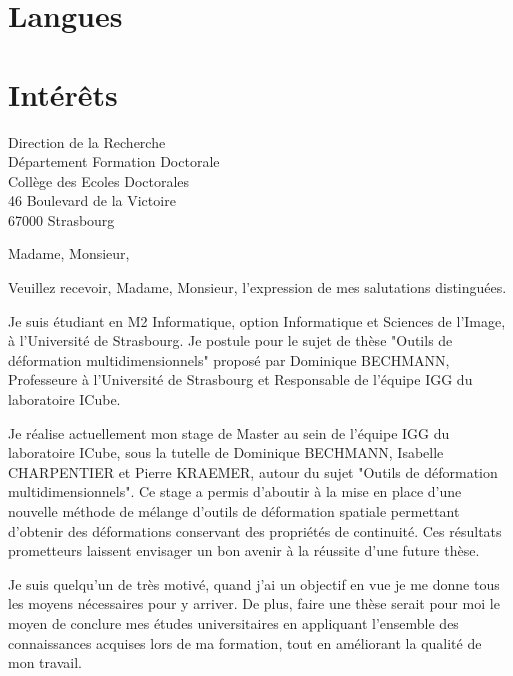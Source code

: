 \documentclass[11pt,a4paper,sans]{moderncv}
\begin{document}
\section{Langues}
\section{Intérêts}

\clearpage
{Direction de la Recherche\\
Département Formation Doctorale\\
Collège des Ecoles Doctorales\\
46 Boulevard de la Victoire\\
67000 Strasbourg}
\date{\mydateformat\today}
\opening{Madame, Monsieur,}
\closing{Veuillez recevoir, Madame, Monsieur, l'expression de mes salutations
distinguées.}
\makelettertitle

Je suis étudiant en M2 Informatique, option Informatique et Sciences de l'Image,
à l'Université de Strasbourg. Je postule pour le sujet de thèse "Outils de
déformation multidimensionnels" proposé par Dominique BECHMANN, Professeure à
l'Université de Strasbourg et Responsable de l'équipe IGG du laboratoire ICube.

Je réalise actuellement mon stage de Master au sein de l'équipe IGG du
laboratoire ICube, sous la tutelle de Dominique BECHMANN, Isabelle CHARPENTIER
et Pierre KRAEMER, autour du sujet "Outils de déformation multidimensionnels".
Ce stage a permis d'aboutir à la mise en place d'une nouvelle méthode de mélange
d'outils de déformation spatiale permettant d'obtenir des déformations
conservant des propriétés de continuité. Ces résultats prometteurs laissent
envisager un bon avenir à la réussite d'une future thèse.

Je suis quelqu'un de très motivé, quand j'ai un objectif en vue je me donne tous
les moyens nécessaires pour y arriver. De plus, faire une thèse serait pour moi
le moyen de conclure mes études universitaires en appliquant l'ensemble des
connaissances acquises lors de ma formation, tout en améliorant la qualité de
mon travail.

\makeletterclosing
\end{document}

